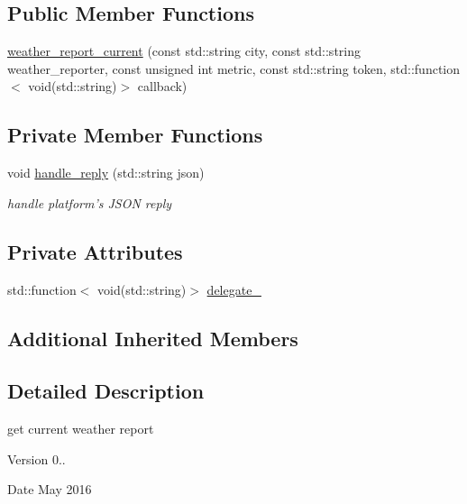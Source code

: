 \subsection*{Public Member Functions}
\begin{DoxyCompactItemize}
\item 
\hyperlink{classrapp_1_1cloud_1_1weather__report__current_adcbaabe3510854ec6d9fd5fe2f368447}{weather\-\_\-report\-\_\-current} (const std\-::string city, const std\-::string weather\-\_\-reporter, const unsigned int metric, const std\-::string token, std\-::function$<$ void(std\-::string)$>$ callback)
\end{DoxyCompactItemize}
\subsection*{Private Member Functions}
\begin{DoxyCompactItemize}
\item 
void \hyperlink{classrapp_1_1cloud_1_1weather__report__current_a1cae8fe412353fafaefcb9f350b349a8}{handle\-\_\-reply} (std\-::string json)
\begin{DoxyCompactList}\small\item\em handle platform's J\-S\-O\-N reply \end{DoxyCompactList}\end{DoxyCompactItemize}
\subsection*{Private Attributes}
\begin{DoxyCompactItemize}
\item 
std\-::function$<$ void(std\-::string)$>$ \hyperlink{classrapp_1_1cloud_1_1weather__report__current_a521006a3b437dad45a11224aafa2e94e}{delegate\-\_\-}
\end{DoxyCompactItemize}
\subsection*{Additional Inherited Members}


\subsection{Detailed Description}
get current weather report 

\begin{DoxyVersion}{Version}
0.. 
\end{DoxyVersion}
\begin{DoxyDate}{Date}
May 2016 
\end{DoxyDate}



